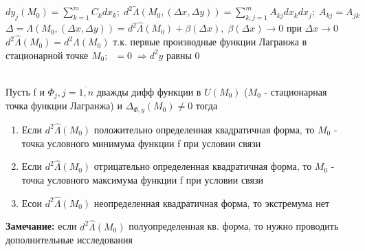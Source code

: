 $dy_j (M_0) = \sum\limits_{k=1}^m C_k dx_k;\; d^2\widetilde{\Lambda}(M_0, (\Delta x, \Delta y))= \sum\limits_{k,j=1}^m A_{kj} dx_k dx_j; \; A_{kj}=A_{jk}$\\
$\Delta =\Lambda(M_0,(\Delta x, \Delta y))=d^2\hat{\Lambda}(M_0)+\beta(\Delta x), \; \beta(\Delta x) \rightarrow 0 $ при $\Delta x\rightarrow 0$ \\
$d^2\hat{\Lambda}(M_0)=d^2\Lambda(M_0)$  т.к. первые производные функции Лагранжа в стационарной точке $M_0 ;\;\; =0 \; \Rightarrow d^2y $ равны 0\\
\\
\begin{theorem}
	Пусть f и $\Phi_j, j=\overline{1,n}$ дважды дифф функции в $U(M_0)$ ($M_0$ - стационарная точка функции Лагранжа) и $\Delta_{\Phi, y}(M_0)\ne 0 $ тогда
	\begin{enumerate}
		\item Если $d^2\hat{\Lambda}(M_0)$ положительно определенная квадратичная форма, то $M_0$ - точка условного минимума  функции f при условии связи
		\item Если $d^2\hat{\Lambda}(M_0)$ отрицательно определенная квадратичная форма, то $M_0$ - точка условного максимума функции f при условии связи
		\item Есои $d^2\hat{\Lambda}(M_0)$ неопределенная квадратичная форма, то экстремума нет
	\end{enumerate}
\end{theorem}
\textbf{Замечание:} если $d^2\hat{\Lambda}(M_0)$ полуопределенная кв. форма, то нужно проводить дополнительные исследования
